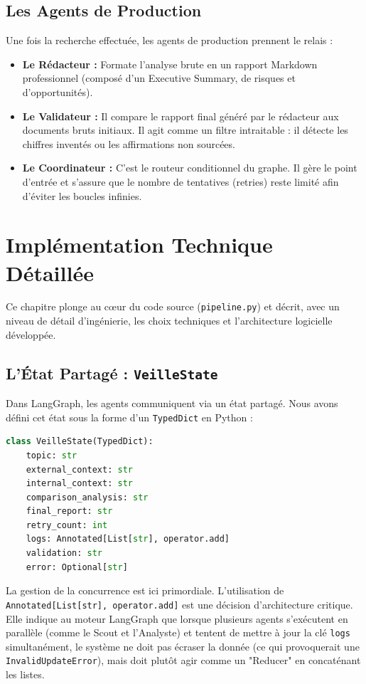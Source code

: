 \documentclass[12pt,a4paper]{report}
\begin{document}
\section{Les Agents de Production}
Une fois la recherche effectuée, les agents de production prennent le relais :
\begin{itemize}
    \item \textbf{Le Rédacteur :} Formate l'analyse brute en un rapport Markdown professionnel (composé d'un Executive Summary, de risques et d'opportunités).
    \item \textbf{Le Validateur :} Il compare le rapport final généré par le rédacteur aux documents bruts initiaux. Il agit comme un filtre intraitable : il détecte les chiffres inventés ou les affirmations non sourcées.
    \item \textbf{Le Coordinateur :} C'est le routeur conditionnel du graphe. Il gère le point d'entrée et s'assure que le nombre de tentatives (retries) reste limité afin d'éviter les boucles infinies.
\end{itemize}

\chapter{Implémentation Technique Détaillée}

Ce chapitre plonge au cœur du code source (\texttt{pipeline.py}) et décrit, avec un niveau de détail d'ingénierie, les choix techniques et l'architecture logicielle développée.

\section{L'État Partagé : \texttt{VeilleState}}
Dans LangGraph, les agents communiquent via un état partagé. Nous avons défini cet état sous la forme d'un \texttt{TypedDict} en Python :

\begin{lstlisting}[language=Python]
class VeilleState(TypedDict):
    topic: str
    external_context: str
    internal_context: str
    comparison_analysis: str
    final_report: str
    retry_count: int
    logs: Annotated[List[str], operator.add]
    validation: str
    error: Optional[str]
\end{lstlisting}

La gestion de la concurrence est ici primordiale. L'utilisation de \texttt{Annotated[List[str], operator.add]} est une décision d'architecture critique. Elle indique au moteur LangGraph que lorsque plusieurs agents s'exécutent en parallèle (comme le Scout et l'Analyste) et tentent de mettre à jour la clé \texttt{logs} simultanément, le système ne doit pas écraser la donnée (ce qui provoquerait une \texttt{InvalidUpdateError}), mais doit plutôt agir comme un "Reducer" en concaténant les listes. 
\end{document}
